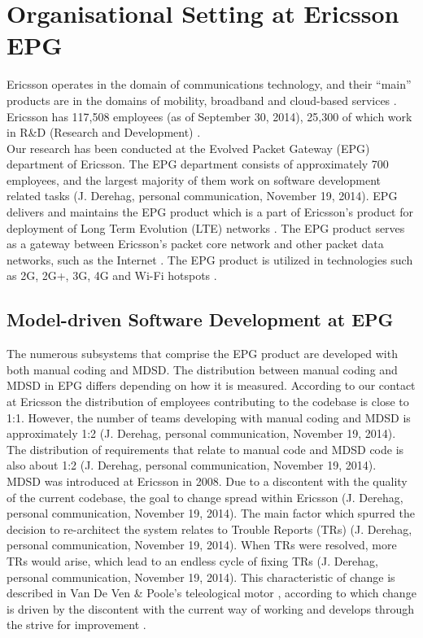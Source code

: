 \documentclass[final_report_innit.tex]{subfiles}
\begin{document}
\section{Organisational Setting at Ericsson EPG}
Ericsson operates in the domain of communications technology, and their ``main'' products are in the domains of mobility, broadband and cloud-based services \cite{etc}\cite{ecf}. Ericsson has 117,508 employees (as of September 30, 2014), 25,300 of which work in R\&D (Research and Development) \cite{etc}.
\\

Our research has been conducted at the Evolved Packet Gateway (EPG) department of Ericsson. The EPG department consists of approximately 700 employees, and the largest majority of them work on software development related tasks (J. Derehag, personal communication, November 19, 2014). EPG delivers and maintains the EPG product which is a part of Ericsson’s product for deployment of Long Term Evolution (LTE) networks \cite{eepg}. The EPG product serves as a gateway between Ericsson’s packet core network and other packet data networks, such as the Internet \cite{eepg}. The EPG product is utilized in technologies such as 2G, 2G+, 3G, 4G and Wi-Fi hotspots \cite{eepg}.

\subsection*{Model-driven Software Development at EPG}
The numerous subsystems that comprise the EPG product are developed with both manual coding and MDSD. The distribution between manual coding and MDSD in EPG differs depending on how it is measured. According to our contact at Ericsson the distribution of employees contributing to the codebase is close to 1:1. However, the number of teams developing with manual coding and MDSD is approximately 1:2 (J. Derehag, personal communication, November 19, 2014). The distribution of requirements that relate to manual code and MDSD code is also about 1:2 (J. Derehag, personal communication, November 19, 2014).
\\

MDSD was introduced at Ericsson in 2008. Due to a discontent with the quality of the current codebase, the goal to change spread within Ericsson (J. Derehag, personal communication, November 19, 2014). The main factor which spurred the decision to re-architect the system relates to Trouble Reports (TRs) (J. Derehag, personal communication, November 19, 2014). When TRs were resolved, more TRs would arise, which lead to an endless cycle of fixing TRs (J. Derehag, personal communication, November 19, 2014). This characteristic of change is described in Van De Ven \& Poole’s teleological motor \cite{van1995explaining}, according to which change is driven by the discontent with the current way of working and develops through the strive for improvement \cite{van1995explaining}. 
\\
\end{document}
